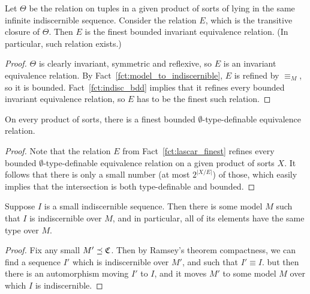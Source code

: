 	\begin{fct}
		\label{fct:lascar_finest}
		Let $\Theta$ be the relation on tuples in a given product of sorts of lying in the same infinite indiscernible sequence. Consider the relation $E$, which is the transitive closure of $\Theta$. Then $E$ is the finest bounded invariant equivalence relation. (In particular, such relation exists.)
	\end{fct}
	\begin{proof}
		$\Theta$ is clearly invariant, symmetric and reflexive, so $E$ is an invariant equivalence relation. By Fact~\ref{fct:model_to_indiscernible}, $E$ is refined by $\equiv_M$, so it is bounded. Fact~\ref{fct:indisc_bdd} implies that it refines every bounded invariant equivalence relation, so $E$ has to be the finest such relation.
	\end{proof}
	
	\begin{fct}
		\label{fct:KP_exists}
		On every product of sorts, there is a finest bounded $\emptyset$-type-definable equivalence relation.
	\end{fct}
	\begin{proof}
		Note that the relation $E$ from Fact~\ref{fct:lascar_finest} refines every bounded $\emptyset$-type-definable equivalence relation on a given product of sorts $X$. It follows that there is only a small number (at most $2^{\lvert X/E\rvert}$) of those, which easily implies that the intersection is both type-definable and bounded.
	\end{proof}
	
	\begin{fct}
		\label{fct:indisc_to_model}
		Suppose $I$ is a small indiscernible sequence. Then there is some model $M$ such that $I$ is indiscernible over $M$, and in particular, all of its elements have the same type over $M$.
	\end{fct}
	\begin{proof}
		Fix any small $M'\preceq {\mathfrak C}$. Then by Ramsey's theorem compactness, we can find a sequence $I'$ which is indiscernible over $M'$, and such that $I'\equiv I$. but then there is an automorphism moving $I'$ to $I$, and it moves $M'$ to some model $M$ over which $I$ is indiscernible.
	\end{proof}
	
